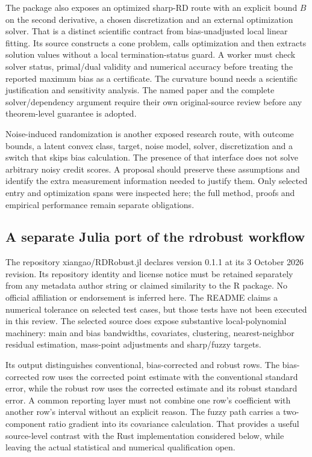 The package also exposes an optimized sharp-RD route with an explicit
bound $B$ on the second derivative, a chosen discretization and an
external optimization solver. That is a distinct scientific contract
from bias-unadjusted local linear fitting. Its source constructs a
cone problem, calls optimization and then extracts solution values
without a local termination-status guard. A worker must check solver
status, primal/dual validity and numerical accuracy before treating the
reported maximum bias as a certificate. The curvature bound needs a
scientific justification and sensitivity analysis. The named paper and
the complete solver/dependency argument require their own original-source
review before any theorem-level guarantee is adopted.
\citep{exec23_otheriv_source_1}

Noise-induced randomization is another exposed research route, with
outcome bounds, a latent convex class, target, noise model, solver,
discretization and a switch that skips bias calculation. The presence
of that interface does not solve arbitrary noisy credit scores. A
proposal should preserve these assumptions and identify the extra
measurement information needed to justify them. Only selected entry
and optimization spans were inspected here; the full method, proofs
and empirical performance remain separate obligations.
\citep{exec23_otheriv_source_1}

\subsection{A separate Julia port of the rdrobust workflow}
\label{exec23:otheriv-port}
The repository xiangao/RDRobust.jl declares version 0.1.1 at its
3 October 2026 revision. Its repository identity and license notice
must be retained separately from any metadata author string or claimed
similarity to the R package. No official affiliation or endorsement is
inferred here. The README claims a numerical tolerance on selected test
cases, but those tests have not been executed in this review. The
selected source does expose substantive local-polynomial machinery: main
and bias bandwidths, covariates, clustering, nearest-neighbor residual
estimation, mass-point adjustments and sharp/fuzzy targets.
\citep{exec23_otheriv_source_3}

Its output distinguishes conventional, bias-corrected and robust rows.
The bias-corrected row uses the corrected point estimate with the
conventional standard error, while the robust row uses the corrected
estimate and its robust standard error. A common reporting layer must
not combine one row's coefficient with another row's interval without
an explicit reason. The fuzzy path carries a two-component ratio
gradient into its covariance calculation. That provides a useful
source-level contrast with the Rust implementation considered below,
while leaving the actual statistical and numerical qualification open.
\citep{exec23_otheriv_source_3}

